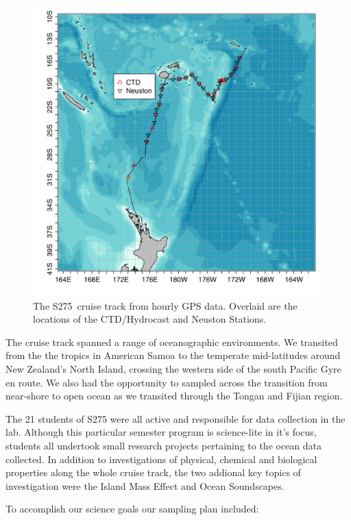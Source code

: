 \documentclass[letterpaper,11pt]{article}
\newcommand{\cruiseID}{S275}
\begin{document}
\begin{figure}[!ht]
\centering
\includegraphics[width=0.65\linewidth]{./plots/S275_cruiseTrack.png}
\caption[The \cruiseID\ cruise track]{The \cruiseID\ cruise track from hourly GPS data. Overlaid are the locations of the CTD/Hydrocast and Neuston Stations.}
\label{cruiseTrack}
\end{figure}

The cruise track spanned a range of oceanographic environments. We transited from the the tropics in American Samoa to the temperate mid-latitudes around New Zealand's North Island, crossing the western side of the south Pacific Gyre en route. We also had the opportunity to sampled across the transition from near-shore to open ocean as we transited through the Tongan and Fijian region.

The 21 students of S275 were all active and responsible for data collection in the lab. Although this particular semester program is science-lite in it's focus, students all undertook small research projects pertaining to the ocean data collected. In addition to investigations of physical, chemical and biological properties along the whole cruise track, the two addional key topics of investigation were the Island Mass Effect and Ocean Soundscapes.

To accomplish our science goals our sampling plan included:
\end{document}
